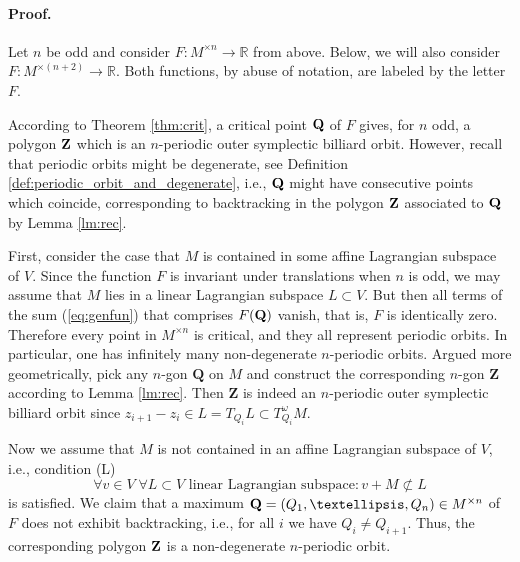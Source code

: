 \documentclass[12pt]{article}
\newcommand{\R}{{\mathbb R}}
\def\proof{\paragraph{Proof.}}
\begin{document}
\proof
Let $n$ be odd and consider $F:M^{\times n}\to\R$ from above. Below, we will also consider $F:M^{\times (n+2)}\to\R$. Both functions, by abuse of notation, are labeled by the letter $F$. 

According to Theorem \ref{thm:crit}, a critical point ${\bf Q}$ of $F$ gives, for $n$ odd, a polygon ${\bf Z}$ which is an $n$-periodic outer symplectic billiard orbit. However, recall that periodic orbits might be degenerate, see Definition \ref{def:periodic_orbit_and_degenerate}, i.e., ${\bf Q}$ might have consecutive points which coincide, corresponding to backtracking in the polygon ${\bf Z}$ associated to ${\bf Q}$ by Lemma \ref{lm:rec}.

First, consider the case that $M$ is contained in some affine Lagrangian subspace of $V$. Since the function $F$ is invariant under translations when $n$ is odd, we may assume that $M$ lies in a linear Lagrangian subspace $L\subset V$. But then all terms of the sum (\ref{eq:genfun}) that comprises $F({\bf Q})$ vanish, that is, $F$ is identically zero. Therefore every point in  $M^{\times n}$ is critical, and they all represent periodic orbits. In particular, one has infinitely many non-degenerate $n$-periodic orbits. Argued more geometrically, pick any $n$-gon $\mathbf{Q}$ on $M$ and construct the corresponding $n$-gon $\mathbf{Z}$ according to Lemma \ref{lm:rec}. Then $\mathbf{Z}$ is indeed an $n$-periodic outer symplectic billiard orbit since $z_{i+1}-z_{i}\in L=T_{Q_i}L\subset T_{Q_i}^\omega M$.

\medskip

Now we assume that $M$ is not contained in an affine Lagrangian subspace of $V$, i.e., condition (L)
\begin{equation}\label{eq:assumption_on_M}\tag{L}
\forall v\in V\;\forall L\subset V \text{ linear Lagrangian subspace}: v+M\not\subset L
\end{equation}
is satisfied. We claim that a maximum ${\bf Q}=(Q_1,\ldots, Q_n)\in M^{\times n}$ of $F$ does not exhibit backtracking, i.e., for all $i$ we have $Q_i\neq Q_{i+1}$. Thus, the corresponding polygon ${\bf Z}$ is a non-degenerate $n$-periodic orbit.
\end{document}
